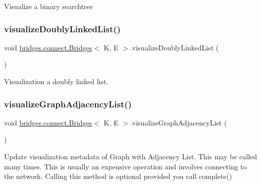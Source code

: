 Visualize a binary searchtree \hypertarget{classbridges_1_1connect_1_1_bridges_ac1ac1db8cf7123aefb83ab05af83375d}{}\label{classbridges_1_1connect_1_1_bridges_ac1ac1db8cf7123aefb83ab05af83375d} 
\subsubsection{\texorpdfstring{visualize\+Doubly\+Linked\+List()}{visualizeDoublyLinkedList()}}
{\footnotesize\ttfamily void \hyperlink{classbridges_1_1connect_1_1_bridges}{bridges.\+connect.\+Bridges}$<$ K, E $>$.visualize\+Doubly\+Linked\+List (\begin{DoxyParamCaption}{ }\end{DoxyParamCaption})\hspace{0.3cm}{\ttfamily [protected]}}

Visualization a doubly linked list. \hypertarget{classbridges_1_1connect_1_1_bridges_a7470f7a358eee6a6cded3ab42f8b9cdc}{}\label{classbridges_1_1connect_1_1_bridges_a7470f7a358eee6a6cded3ab42f8b9cdc} 
\subsubsection{\texorpdfstring{visualize\+Graph\+Adjacency\+List()}{visualizeGraphAdjacencyList()}}
{\footnotesize\ttfamily void \hyperlink{classbridges_1_1connect_1_1_bridges}{bridges.\+connect.\+Bridges}$<$ K, E $>$.visualize\+Graph\+Adjacency\+List (\begin{DoxyParamCaption}{ }\end{DoxyParamCaption})\hspace{0.3cm}{\ttfamily [protected]}}

Update visualization metadata of Graph with Adjacency List. This may be called many times. This is usually an expensive operation and involves connecting to the network. Calling this method is optional provided you call complete() \hypertarget{classbridges_1_1connect_1_1_bridges_a13c154c2a656dd4c19f2ff0e767f63c3}{}\label{classbridges_1_1connect_1_1_bridges_a13c154c2a656dd4c19f2ff0e767f63c3} 
